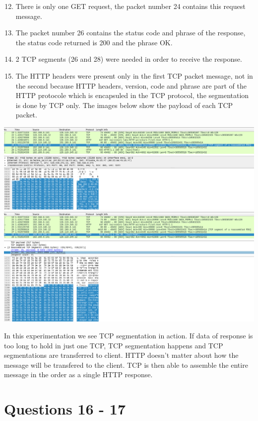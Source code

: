 \documentclass[a4paper,11pt,final]{report}
\begin{document}
\begin{enumerate}
\setcounter{enumi}{11}
\item There is only one GET request, the packet number 24 contains this request message.
\item The packet number 26 contains the status code and phrase of the response, the status code returned is 200 and the phrase OK.
\item 2 TCP segments (26 and 28) were needed in order to receive the response.
\item The HTTP headers were present only in the first TCP packet message, not in the second because HTTP headers, version, code and phrase are part of the HTTP protocole which is encapsuled in the TCP protocol, the segmentation is done by TCP only. The images below show the payload of each TCP packet.
\end{enumerate}
\includegraphics[width=\linewidth]{TCPPayload1}
\includegraphics[width=\linewidth]{TCPPayload2}

In this experimentation we see TCP segmentation in action. If data of response is too long to hold in just one TCP, TCP segmentation happens and TCP segmentations are transferred to client. HTTP doesn't matter about how the message will be transfered to the client. TCP is then able to assemble the entire message in the order as a single HTTP response.

\chapter{Questions 16 - 17}
\end{document}
